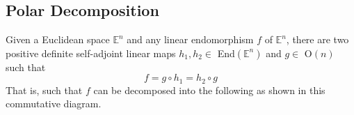 \subsection{Polar Decomposition}

  \begin{theorem}
    Given a Euclidean space $\mathbb{E}^n$ and any linear endomorphism $f$ of $\mathbb{E}^n$, there are two positive definite self-adjoint linear maps $h_1, h_2 \in$ End$(\mathbb{E}^n)$ and $g \in$ O$(n)$ such that
    \begin{equation}
      f = g \circ h_1 = h_2 \circ g
    \end{equation}
    That is, such that $f$ can be decomposed into the following as shown in this commutative diagram. 
  \end{theorem}

